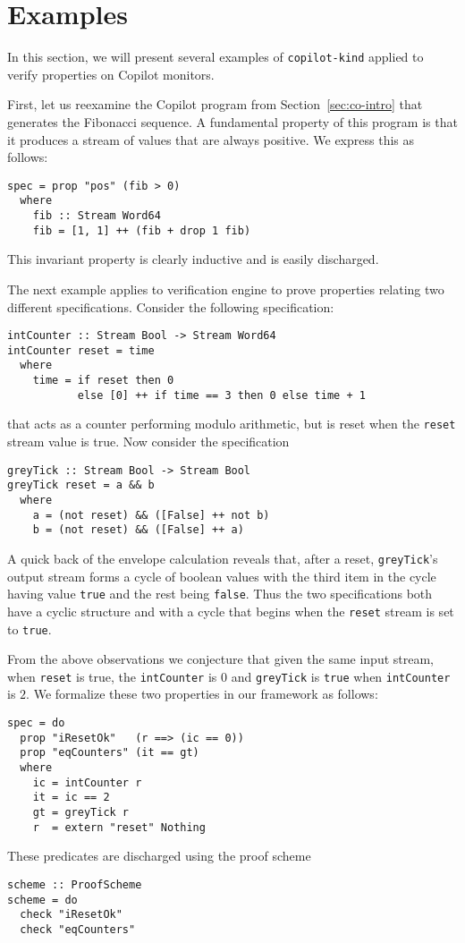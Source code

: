\section{Examples}\label{sec:example}

In this section,  we will present several examples of
\texttt{copilot-kind} applied to verify properties on Copilot
monitors.


 First, let us reexamine the Copilot program from
 Section~\ref{sec:co-intro} that generates the  Fibonacci
 sequence. A fundamental property of this program is that it produces
 a stream of values that are always positive. We express this as follows:
\begin{lstlisting}[frame=single]
spec = prop "pos" (fib > 0)
  where
    fib :: Stream Word64
    fib = [1, 1] ++ (fib + drop 1 fib)
\end{lstlisting}
This  invariant property is clearly inductive and is easily
discharged. 
 
The next example applies to verification engine to prove properties
relating two different specifications. Consider the following
specification:
\begin{lstlisting}[frame=single]
intCounter :: Stream Bool -> Stream Word64
intCounter reset = time
  where 
    time = if reset then 0
           else [0] ++ if time == 3 then 0 else time + 1
\end{lstlisting}
that acts as a counter performing modulo arithmetic, but is
reset when the \texttt{reset} stream value is true.  Now consider the
specification
\begin{lstlisting}[frame=single]
greyTick :: Stream Bool -> Stream Bool
greyTick reset = a && b
  where
    a = (not reset) && ([False] ++ not b)
    b = (not reset) && ([False] ++ a)
\end{lstlisting}
A quick back of the envelope calculation reveals that,
after a reset, \texttt{greyTick}'s output stream forms a cycle of
boolean values with the third item in the cycle having value
\texttt{true} and the rest being \texttt{false}.  Thus the two
specifications both have a cyclic structure and with a cycle that
begins when the \texttt{reset} stream is set to \texttt{true}.  

From the above observations we 
conjecture that given the same input stream, when \texttt{reset} is
true,  the \texttt{intCounter} is $0$ and \texttt{greyTick} is
\texttt{true} when \texttt{intCounter} is $2.$ We formalize these two
properties in our framework as follows:
\begin{lstlisting}[frame=single]
spec = do
  prop "iResetOk"   (r ==> (ic == 0))
  prop "eqCounters" (it == gt)
  where
    ic = intCounter r
    it = ic == 2
    gt = greyTick r
    r  = extern "reset" Nothing
\end{lstlisting}
These predicates are discharged using the proof scheme
\begin{lstlisting}[frame=single]
scheme :: ProofScheme
scheme = do
  check "iResetOk"
  check "eqCounters"
\end{lstlisting}  
